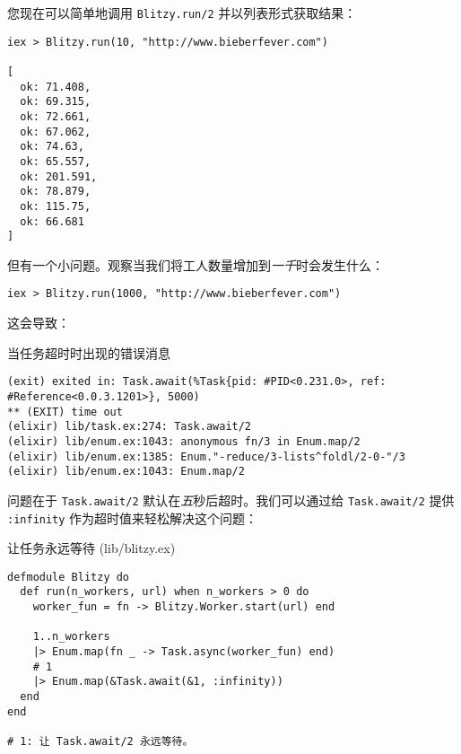您现在可以简单地调用 \texttt{Blitzy.run/2}
并以列表形式获取结果：

\begin{code}{}
\begin{verbatim}
iex > Blitzy.run(10, "http://www.bieberfever.com")

[
  ok: 71.408,
  ok: 69.315,
  ok: 72.661,
  ok: 67.062,
  ok: 74.63,
  ok: 65.557,
  ok: 201.591,
  ok: 78.879,
  ok: 115.75,
  ok: 66.681
]
\end{verbatim}
\end{code}

但有一个小问题。观察当我们将工人数量增加到\emph{一千}时会发生什么：

\begin{code}{}
\begin{verbatim}
iex > Blitzy.run(1000, "http://www.bieberfever.com")
\end{verbatim}
\end{code}

这会导致：

\begin{code}{当任务超时时出现的错误消息}

\begin{verbatim}
(exit) exited in: Task.await(%Task{pid: #PID<0.231.0>, ref: #Reference<0.0.3.1201>}, 5000)
** (EXIT) time out
(elixir) lib/task.ex:274: Task.await/2
(elixir) lib/enum.ex:1043: anonymous fn/3 in Enum.map/2
(elixir) lib/enum.ex:1385: Enum."-reduce/3-lists^foldl/2-0-"/3
(elixir) lib/enum.ex:1043: Enum.map/2
\end{verbatim}
\end{code}

问题在于 \texttt{Task.await/2}
默认在\emph{五}秒后超时。我们可以通过给
\texttt{Task.await/2} 提供
\texttt{:infinity} 作为超时值来轻松解决这个问题：

\begin{code}{让任务永远等待 (lib/blitzy.ex)}

\begin{verbatim}
defmodule Blitzy do
  def run(n_workers, url) when n_workers > 0 do
    worker_fun = fn -> Blitzy.Worker.start(url) end

    1..n_workers
    |> Enum.map(fn _ -> Task.async(worker_fun) end)
    # 1
    |> Enum.map(&Task.await(&1, :infinity))
  end
end

# 1: 让 Task.await/2 永远等待。
\end{verbatim}
\end{code}


